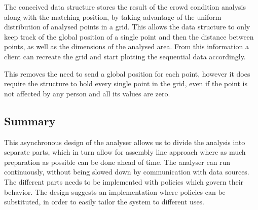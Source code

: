 The conceived data structure stores the result of the crowd condition analysis along with the matching position, by taking advantage of the uniform distribution of analysed points in a grid. This allows the data structure to only keep track of the global position of a single point and then the distance between points, as well as the dimensions of the analysed area. From this information a client can recreate the grid and start plotting the sequential data accordingly.

This removes the need to send a global position for each point, however it does require the structure to hold every single point in the grid, even if the point is not affected by any person and all its values are zero.


\subsection{Summary}

This asynchronous design of the analyser allows us to divide the analysis into separate parts, which in turn allow for assembly line approach where as much preparation as possible can be done ahead of time. The analyser can run continuously, without being slowed down by communication with data sources. The different parts needs to be implemented with policies which govern their behavior. The design suggests an implementation where policies can be substituted, in order to easily tailor the system to different uses.
